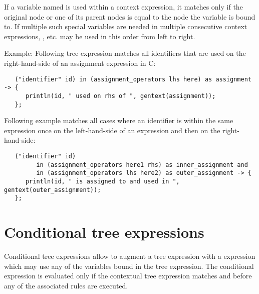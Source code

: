 \noindent
If a variable named  is used within a context expression,
it matches only if the original node or one of its parent nodes is equal
to the node the variable  is bound to. If multiple such
special variables are needed in multiple consecutive context expressions,
,  etc. may be used in this order from left
to right.

Example: Following tree expression matches all identifiers that are
used on the right-hand-side of an assignment expression in C:

\begin{lstlisting}
   ("identifier" id) in (assignment_operators lhs here) as assignment -> {
      println(id, " used on rhs of ", gentext(assignment));
   };
\end{lstlisting}

\noindent
Following example matches all cases where an identifier is within
the same expression once on the left-hand-side of an expression and
then on the right-hand-side:

\begin{lstlisting}
   ("identifier" id)
         in (assignment_operators here1 rhs) as inner_assignment and
         in (assignment_operators lhs here2) as outer_assignment -> {
      println(id, " is assigned to and used in ", gentext(outer_assignment));
   };
\end{lstlisting}

\section{Conditional tree expressions}

Conditional tree expressions allow to augment a tree expression with
a expression which may use any of the variables bound in the tree
expression. The conditional expression is evaluated only if the
contextual tree expression matches and before any of the associated
rules are executed.

\begin{grammar}
      \produces {} \\
      \produces {}
	  
\end{grammar}

\endinput
